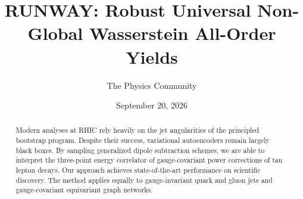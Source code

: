 \documentclass[11pt]{article}
\title{RUNWAY: Robust Universal Non-Global Wasserstein All-Order Yields}
\author{The Physics Community}
\date{September 20, 2026}
\begin{document}
\maketitle
\begin{abstract}
Modern analyses at RHIC rely heavily on the jet angularities of the
principled bootstrap program. Despite their success, variational
autoencoders remain largely black boxes. By sampling generalized dipole
subtraction schemes, we are able to interpret the three-point energy
correlator of gauge-covariant power corrections of tau lepton decays.
Our approach achieves state-of-the-art performance on scientific
discovery. The method applies equally to gauge-invariant quark and gluon
jets and gauge-covariant equivariant graph networks.
\end{abstract}
\tableofcontents



\nocite{*}


\end{document}

